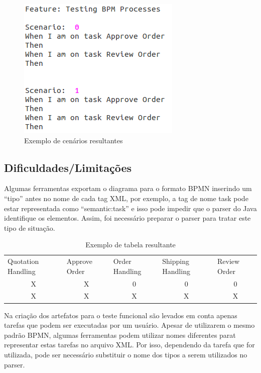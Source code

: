 \documentclass[12pt]{article}
\begin{document}
\begin{figure}[ht]
\centering
\includegraphics[width=.5\textwidth]{figuras/exemplo_cenario.png}
\caption{Exemplo de cenários resultantes}
\label{fig:exemplo_cenario}
\end{figure}


\subsection{Dificuldades/Limitações}
Algumas ferramentas exportam o diagrama para o formato BPMN inserindo um ``tipo'' antes no nome de cada tag XML, por exemplo, a tag de nome task pode estar representada como ``semantic:task'' e isso pode impedir que o parser do Java identifique os elementos. Assim, foi necessário preparar o parser para tratar este tipo de situação.

\begin{table}[]
\centering
\caption{Exemplo de tabela resultante}
\label{tab:exemplo}
\begin{tabular}{ccccc}
\multicolumn{1}{l}{Quotation Handling} & \multicolumn{1}{l}{Approve Order} & \multicolumn{1}{l}{Order Handling} & \multicolumn{1}{l}{Shipping Handling} & \multicolumn{1}{l}{Review Order} \\
X & X & 0 & 0 & 0 \\
X & X & X & X & X
\end{tabular}
\end{table}


Na criação dos artefatos para o teste funcional são levados em conta apenas tarefas que podem ser executadas por um usuário. Apesar de utilizarem o mesmo padrão BPMN, algumas ferramentas podem utilizar nomes diferentes parat representar estas tarefas no arquivo XML. Por isso, dependendo da tarefa que for utilizada, pode ser necessário substituir o nome dos tipos a serem utilizados no parser.
\end{document}
